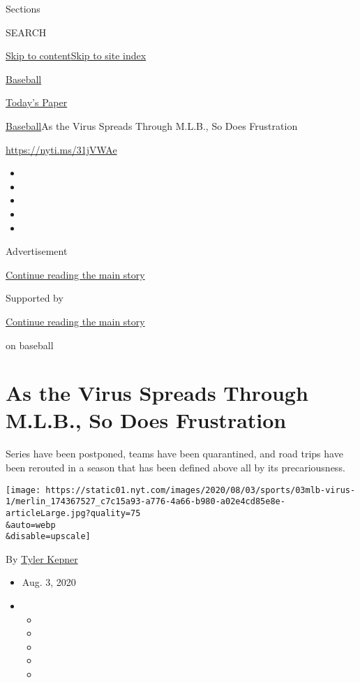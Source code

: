 Sections

SEARCH

\protect\hyperlink{site-content}{Skip to
content}\protect\hyperlink{site-index}{Skip to site index}

\href{https://www.nytimes.com/section/sports/baseball}{Baseball}

\href{https://myaccount.nytimes.com/auth/login?response_type=cookie\&client_id=vi}{}

\href{https://www.nytimes.com/section/todayspaper}{Today's Paper}

\href{/section/sports/baseball}{Baseball}\textbar{}As the Virus Spreads
Through M.L.B., So Does Frustration

\url{https://nyti.ms/31jVWAe}

\begin{itemize}
\item
\item
\item
\item
\item
\end{itemize}

Advertisement

\protect\hyperlink{after-top}{Continue reading the main story}

Supported by

\protect\hyperlink{after-sponsor}{Continue reading the main story}

on baseball

\hypertarget{as-the-virus-spreads-through-mlb-so-does-frustration}{%
\section{As the Virus Spreads Through M.L.B., So Does
Frustration}\label{as-the-virus-spreads-through-mlb-so-does-frustration}}

Series have been postponed, teams have been quarantined, and road trips
have been rerouted in a season that has been defined above all by its
precariousness.

\texttt{[image: https://static01.nyt.com/images/2020/08/03/sports/03mlb-virus-1/merlin\_174367527\_c7c15a93-a776-4a66-b980-a02e4cd85e8e-articleLarge.jpg?quality=75\\\&auto=webp\\\&disable=upscale]}

By \href{https://www.nytimes.com/by/tyler-kepner}{Tyler Kepner}

\begin{itemize}
\item
  Aug. 3, 2020
\item
  \begin{itemize}
  \item
  \item
  \item
  \item
  \item
  \end{itemize}
\end{itemize}

